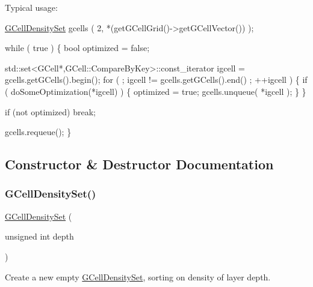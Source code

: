 Typical usage\+: 
\begin{DoxyCode}
\hyperlink{classKatabatic_1_1GCellDensitySet_ad74cbb404ad28f734f5759462aa9f363}{GCellDensitySet} gcells ( 2, *(getGCellGrid()->getGCellVector()) );

\textcolor{keywordflow}{while} ( \textcolor{keyword}{true} ) \{
    \textcolor{keywordtype}{bool} optimized = \textcolor{keyword}{false};

    std::set<GCell*,GCell::CompareByKey>::const\_iterator igcell = gcells.getGCells().begin();
    \textcolor{keywordflow}{for} ( ; igcell != gcells.getGCells().end() ; ++igcell ) \{
        \textcolor{keywordflow}{if} ( doSomeOptimization(*igcell) ) \{
          optimized = \textcolor{keyword}{true};
          gcells.unqueue( *igcell );
        \}
    \}

    \textcolor{keywordflow}{if} (not optimized) \textcolor{keywordflow}{break};

    gcells.requeue();
\}
\end{DoxyCode}
 

\subsection{Constructor \& Destructor Documentation}
\mbox{\label{classKatabatic_1_1GCellDensitySet_ad74cbb404ad28f734f5759462aa9f363}} 
\subsubsection{\texorpdfstring{G\+Cell\+Density\+Set()}{GCellDensitySet()}\hspace{0.1cm}{\footnotesize\ttfamily [1/2]}}
{\footnotesize\ttfamily \hyperlink{classKatabatic_1_1GCellDensitySet}{G\+Cell\+Density\+Set} (\begin{DoxyParamCaption}\item[{unsigned int}]{depth }\end{DoxyParamCaption})}

Create a new empty \hyperlink{classKatabatic_1_1GCellDensitySet}{G\+Cell\+Density\+Set}, sorting on density of layer {\ttfamily depth}. \mbox{\label{classKatabatic_1_1GCellDensitySet_a5d97169315528fca978d5e65a3cc8130}} 
